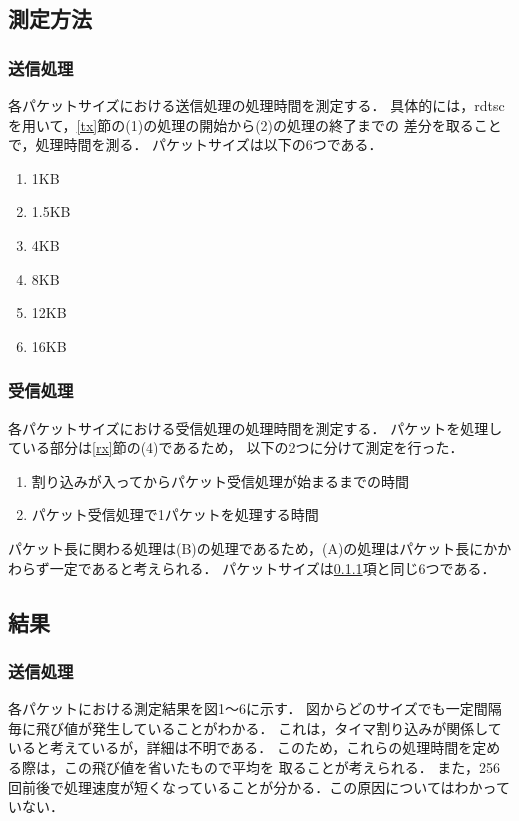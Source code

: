 \documentclass[12pt]{jsarticle}
\def\labelenumi{(\theenumi)}
\begin{document}
\subsection{測定方法}
\subsubsection{送信処理}\label{tx-m}
各パケットサイズにおける送信処理の処理時間を測定する．
具体的には，rdtscを用いて，\ref{tx}節の(1)の処理の開始から(2)の処理の終了までの
差分を取ることで，処理時間を測る．
パケットサイズは以下の6つである．
\begin{enumerate}
    \item 1KB
    \item 1.5KB
    \item 4KB
    \item 8KB
    \item 12KB
    \item 16KB
\end{enumerate}

\subsubsection{受信処理}
各パケットサイズにおける受信処理の処理時間を測定する．
パケットを処理している部分は\ref{rx}節の(4)であるため，
以下の2つに分けて測定を行った．
\renewcommand{\labelenumi}{(\Alph{enumi})}
\begin{enumerate}
    \item 割り込みが入ってからパケット受信処理が始まるまでの時間
    \item パケット受信処理で1パケットを処理する時間
\end{enumerate}
パケット長に関わる処理は(B)の処理であるため，(A)の処理はパケット長にかかわらず一定であると考えられる．
パケットサイズは\ref{tx-m}項と同じ6つである．

\subsection{結果}
\subsubsection{送信処理}
各パケットにおける測定結果を図1〜6に示す．
図からどのサイズでも一定間隔毎に飛び値が発生していることがわかる．
これは，タイマ割り込みが関係していると考えているが，詳細は不明である．
このため，これらの処理時間を定める際は，この飛び値を省いたもので平均を
取ることが考えられる．
また，256回前後で処理速度が短くなっていることが分かる．この原因についてはわかっていない．
\end{document}
